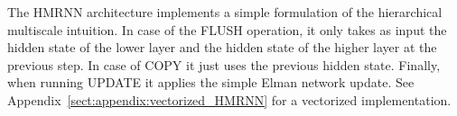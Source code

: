 \begin{description}
The HMRNN architecture implements a simple formulation of the hierarchical 
multiscale intuition. In case of the FLUSH operation, it only takes as input 
the hidden state of the lower layer and the hidden state of the higher layer 
at the previous step. In case of COPY it just uses the previous hidden state. 
Finally, when running UPDATE it applies the simple Elman network update. See Appendix~\ref{sect:appendix:vectorized_HMRNN} for a vectorized implementation.









\end{description}




